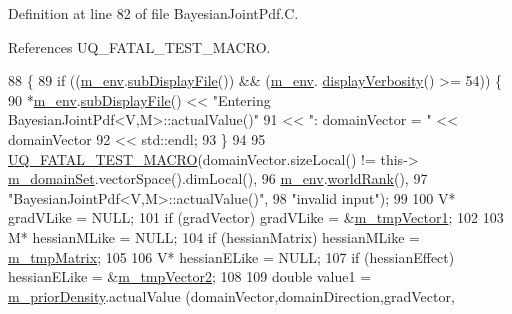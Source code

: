 Definition at line 82 of file Bayesian\-Joint\-Pdf.\-C.



References U\-Q\-\_\-\-F\-A\-T\-A\-L\-\_\-\-T\-E\-S\-T\-\_\-\-M\-A\-C\-R\-O.


\begin{DoxyCode}
88 \{
89   \textcolor{keywordflow}{if} ((\hyperlink{class_q_u_e_s_o_1_1_base_scalar_function_adf44141aeb765d97613286f88f235f04}{m\_env}.\hyperlink{class_q_u_e_s_o_1_1_base_environment_a8a0064746ae8dddfece4229b9ad374d6}{subDisplayFile}()) && (\hyperlink{class_q_u_e_s_o_1_1_base_scalar_function_adf44141aeb765d97613286f88f235f04}{m\_env}.
      \hyperlink{class_q_u_e_s_o_1_1_base_environment_a1fe5f244fc0316a0ab3e37463f108b96}{displayVerbosity}() >= 54)) \{
90     *\hyperlink{class_q_u_e_s_o_1_1_base_scalar_function_adf44141aeb765d97613286f88f235f04}{m\_env}.\hyperlink{class_q_u_e_s_o_1_1_base_environment_a8a0064746ae8dddfece4229b9ad374d6}{subDisplayFile}() << \textcolor{stringliteral}{"Entering BayesianJointPdf<V,M>::actualValue()"}
91                             << \textcolor{stringliteral}{": domainVector = "} << domainVector
92                             << std::endl;
93   \}
94 
95   \hyperlink{_defines_8h_a56d63d18d0a6d45757de47fcc06f574d}{UQ\_FATAL\_TEST\_MACRO}(domainVector.sizeLocal() != this->
      \hyperlink{class_q_u_e_s_o_1_1_base_scalar_function_a67696e86211197938c72cd11863f5cf8}{m\_domainSet}.vectorSpace().dimLocal(),
96                       \hyperlink{class_q_u_e_s_o_1_1_base_scalar_function_adf44141aeb765d97613286f88f235f04}{m\_env}.\hyperlink{class_q_u_e_s_o_1_1_base_environment_a78b57112bbd0e6dd0e8afec00b40ffa7}{worldRank}(),
97                       \textcolor{stringliteral}{"BayesianJointPdf<V,M>::actualValue()"},
98                       \textcolor{stringliteral}{"invalid input"});
99 
100   V* gradVLike = NULL;
101   \textcolor{keywordflow}{if} (gradVector) gradVLike = &\hyperlink{class_q_u_e_s_o_1_1_bayesian_joint_pdf_af4252d2628298423a60335eef72136c6}{m\_tmpVector1};
102 
103   M* hessianMLike = NULL;
104   \textcolor{keywordflow}{if} (hessianMatrix) hessianMLike = \hyperlink{class_q_u_e_s_o_1_1_bayesian_joint_pdf_a686da1b57929c8b506a5e8fe8974603d}{m\_tmpMatrix};
105 
106   V* hessianELike = NULL;
107   \textcolor{keywordflow}{if} (hessianEffect) hessianELike = &\hyperlink{class_q_u_e_s_o_1_1_bayesian_joint_pdf_a2c81721bddf0ffd5547751f1a8221a5d}{m\_tmpVector2};
108 
109   \textcolor{keywordtype}{double} value1 = \hyperlink{class_q_u_e_s_o_1_1_bayesian_joint_pdf_a3cafafe8c5ea2353eedaecee156f609a}{m\_priorDensity}.actualValue (domainVector,domainDirection,gradVector,

\end{DoxyCode}
